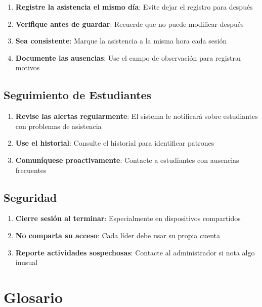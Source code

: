 \documentclass[11pt,a4paper]{article}
\begin{document}
\begin{enumerate}
  \item \textbf{Registre la asistencia el mismo día}: Evite dejar el registro para después
  \item \textbf{Verifique antes de guardar}: Recuerde que no puede modificar después
  \item \textbf{Sea consistente}: Marque la asistencia a la misma hora cada sesión
  \item \textbf{Documente las ausencias}: Use el campo de observación para registrar motivos
\end{enumerate}

\subsection{Seguimiento de Estudiantes}

\begin{enumerate}
  \item \textbf{Revise las alertas regularmente}: El sistema le notificará sobre estudiantes con problemas de asistencia
  \item \textbf{Use el historial}: Consulte el historial para identificar patrones
  \item \textbf{Comuníquese proactivamente}: Contacte a estudiantes con ausencias frecuentes
\end{enumerate}

\subsection{Seguridad}

\begin{enumerate}
  \item \textbf{Cierre sesión al terminar}: Especialmente en dispositivos compartidos
  \item \textbf{No comparta su acceso}: Cada líder debe usar su propia cuenta
  \item \textbf{Reporte actividades sospechosas}: Contacte al administrador si nota algo inusual
\end{enumerate}

\section{Glosario}
\end{document}
